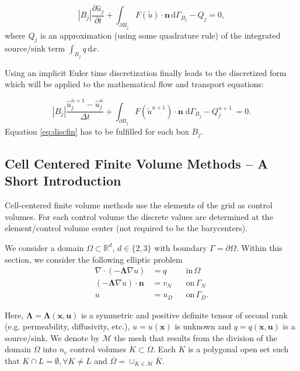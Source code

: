 \begin{equation}
\label{eq:disc1}
	|B_j| \frac{\partial \hat u_j}{\partial t}
	+  \int_{\partial B_j}  F(\tilde u) \cdot \mathbf n \, \mathrm{d}\Gamma_{B_j} - Q_j = 0,
\end{equation}
where $Q_j$ is an approximation (using some quadrature rule) of the integrated source/sink term $\int_{B_j} q \, \mathrm{d}x$.

Using an implicit Euler time discretization finally
leads to the discretized form which will be applied to the mathematical
flow and transport equations:

\begin{equation}
\label{eq:discfin}
	|B_j| \frac{\hat u_j^{n+1} - \hat u_j^{n}}{\Delta t}
	+ \int_{\partial B_j}  F(\tilde u^{n+1}) \cdot \mathbf n
	\;   \mathrm{d}\Gamma_{B_j} - Q_j^{n+1} \: = 0.
\end{equation}
Equation \eqref{eq:discfin} has to be fulfilled for each box $B_j$.

\subsection{Cell Centered Finite Volume Methods -- A Short Introduction}\label{cc}
Cell-centered finite volume methods use the elements of the grid as control volumes.
For each control volume the discrete values are determined at the element/control
volume center (not required to be the barycenters). 

We consider a domain $\Omega \subset \mathbb{R}^d$, $d \in \{ 2, 3 \}$ with boundary $\Gamma = \partial \Omega$. Within this section, we consider the following elliptic problem
\begin{equation}
  \begin{aligned}
                   \nabla \cdot \left( - \mathbf{\Lambda} \nabla u \right) &= q   &&\mathrm{in} \, \Omega \\
               \left( - \mathbf{\Lambda} \nabla u \right) \cdot \mathbf{n} &= v_N &&\mathrm{on} \, \Gamma_N \\
                                                                   u &= u_D &&\mathrm{on} \, \Gamma_D.
    \label{eq:elliptic}
  \end{aligned}
\end{equation}

Here, $\mathbf{\Lambda} = \mathbf{\Lambda}(\mathbf{x}, \mathbf{u})$ is a symmetric and positive definite tensor of second rank (e.g. permeability, diffusivity, etc.), $u = u (\mathbf{x})$ is unknown and $q = q(\mathbf{x}, \mathbf{u})$ is a source/sink. 
We denote by $\mathcal{M}$ the mesh that results from the division of the domain $\Omega$ into $n_e$ control volumes $K \subset \Omega$. Each $K$ is a polygonal open set such that $K \cap L = \emptyset, \forall{K \neq L}$ and $\overline{\Omega} = \cup_{K \in \mathcal{M}} \overline{K}$. 

